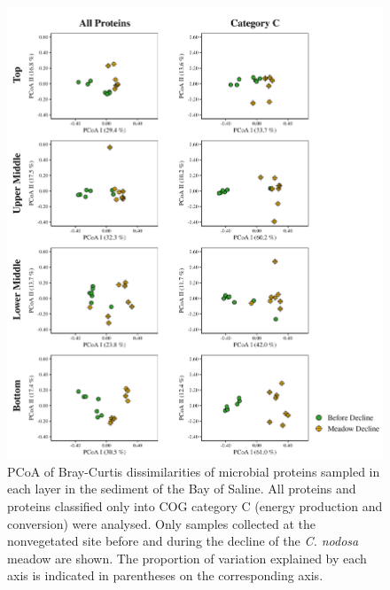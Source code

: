 \documentclass[
  12 pt,
]{article}
\begin{document}
\begin{figure}[H]

{\centering \includegraphics[width=0.95\linewidth]{../results/figures/pcoa_layer} 

}

\caption{PCoA of Bray-Curtis dissimilarities of microbial proteins sampled in each layer in the sediment of the Bay of Saline. All proteins and proteins classified only into COG category C (energy production and conversion) were analysed. Only samples collected at the nonvegetated site before and during the decline of the \emph{C. nodosa} meadow are shown. The proportion of variation explained by each axis is indicated in parentheses on the corresponding axis.}\label{fig:pcoa-layer}
\end{figure}
\end{document}
